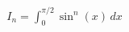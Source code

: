 \documentclass[preview]{standalone}
\begin{document}
\begin{align*}
I_n = \int_{0}^{\pi/2} \sin^n(x) \, dx
\end{align*}
\end{document}
